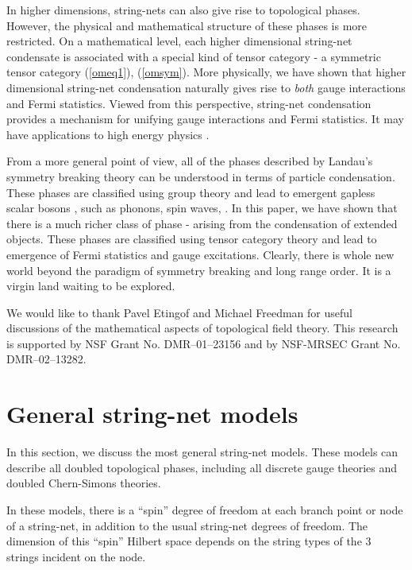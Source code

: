 \documentclass[aps,twocolumn,groupedaddress,showpacs,floatfix]{revtex4}
\begin{document}
In higher dimensions, string-nets can also give rise to topological phases.
However, the physical and mathematical structure of these phases is more
restricted. On a mathematical level, each higher dimensional string-net
condensate is associated with a special kind of tensor category - a symmetric
tensor category (\ref{omeq1}), (\ref{omsym}). More physically, we have shown
that higher dimensional string-net condensation naturally gives rise to
\emph{both} gauge interactions and Fermi statistics.  Viewed from this
perspective, string-net condensation provides a mechanism for unifying 
gauge interactions and Fermi statistics. It may have applications to high 
energy physics \cite{Wqoem}.

From a more general point of view, all of the phases described by Landau's
symmetry breaking theory can be understood in terms of particle 
condensation.  These phases are classified using group theory and lead to 
emergent gapless scalar bosons \cite{N6080,G6154}, such as phonons, spin waves,
\etc. In this paper, we have shown that there is a much richer class of phase -
arising from the condensation of extended objects. These phases are classified 
using tensor category theory and lead to emergence of Fermi statistics and 
gauge excitations. Clearly, there is whole new world beyond the paradigm of 
symmetry breaking and long range order. It is a virgin land waiting to 
be explored.

We would like to thank Pavel Etingof and Michael Freedman for useful
discussions of the mathematical aspects of topological field theory.  This
research is supported by NSF Grant No. DMR--01--23156 and by NSF-MRSEC Grant
No. DMR--02--13282.

\appendix

\section{General string-net models}
\label{genstr}

In this section, we discuss the most general string-net models. These
models can describe all doubled topological phases, including all discrete
gauge theories and doubled Chern-Simons theories. 

In these models, there is a ``spin'' degree of freedom at each branch point 
or node of a string-net, in addition to the usual string-net 
degrees of freedom. The dimension of this ``spin'' Hilbert space
depends on the string types of the $3$ strings incident on the node. 
\end{document}
